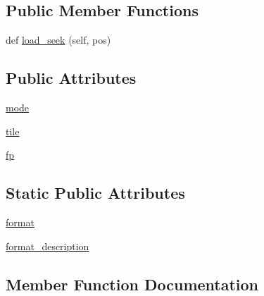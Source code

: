 \subsection*{Public Member Functions}
\begin{DoxyCompactItemize}
\item 
def \hyperlink{classPIL_1_1FtexImagePlugin_1_1FtexImageFile_a8371ef05b698dbc1ece1e3da67cc2e6f}{load\+\_\+seek} (self, pos)
\end{DoxyCompactItemize}
\subsection*{Public Attributes}
\begin{DoxyCompactItemize}
\item 
\hyperlink{classPIL_1_1FtexImagePlugin_1_1FtexImageFile_a448b7447616c641a9323ddb35f6f71c8}{mode}
\item 
\hyperlink{classPIL_1_1FtexImagePlugin_1_1FtexImageFile_aa44eb3f885d2159dea843e33bcfb2835}{tile}
\item 
\hyperlink{classPIL_1_1FtexImagePlugin_1_1FtexImageFile_a4c92acb86536bcd40da472ad00e7ed3c}{fp}
\end{DoxyCompactItemize}
\subsection*{Static Public Attributes}
\begin{DoxyCompactItemize}
\item 
\hyperlink{classPIL_1_1FtexImagePlugin_1_1FtexImageFile_a8ace53e2c1313bc83ac79b6a38e7d037}{format}
\item 
\hyperlink{classPIL_1_1FtexImagePlugin_1_1FtexImageFile_a63fcdc71703405bdc0dfc5678c64b3ad}{format\+\_\+description}
\end{DoxyCompactItemize}


\subsection{Member Function Documentation}
\mbox{\label{classPIL_1_1FtexImagePlugin_1_1FtexImageFile_a8371ef05b698dbc1ece1e3da67cc2e6f}} 
